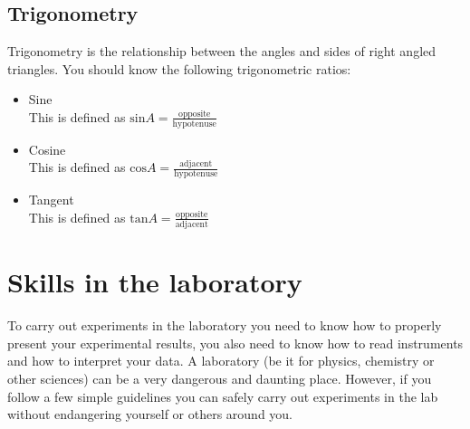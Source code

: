\begin{enumerate}[label=\textbf{\arabic*}.]
\subsection*{Trigonometry}
Trigonometry is the relationship between the angles and sides of right angled triangles. You should know the following trigonometric ratios:
\begin{itemize}
 \item Sine\\
This is defined as $\text{sin} A = \frac{\text{opposite}}{\text{hypotenuse}}$
\item Cosine \\
This is defined as $\text{cos} A = \frac{\text{adjacent}}{\text{hypotenuse}}$
\item Tangent \\
This is defined as $\text{tan} A = \frac{\text{opposite}}{\text{adjacent}}$
\end{itemize}

\section{Skills in the laboratory}
To carry out experiments in the laboratory you need to know how to properly present your experimental results, you also need to know how to read instruments and how to interpret your data. A laboratory (be it for physics, chemistry or other sciences) can be a very dangerous and daunting place. However, if you follow a few simple guidelines you can safely carry out experiments in the lab without endangering yourself or others around you.

\end{enumerate}
